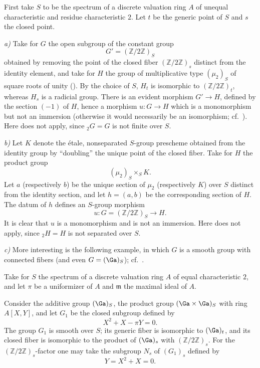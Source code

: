 First take \(S\) to be the spectrum of a discrete valuation ring
\(A\) of unequal characteristic and residue characteristic \(2\).
Let \(t\) be the generic point of \(S\) and \(s\) the closed point.

\medskip
\noindent\textit{a)} Take for \(G\) the open subgroup of the constant
group
\[
  G'=(\mathbb Z/2\mathbb Z)_S
\]
obtained by removing the point of the closed fiber
\((\mathbb Z/2\mathbb Z)_s\) distinct from the identity element, and
take for \(H\) the group of multiplicative type
\((\mu_2)_S\) of square roots of unity (). By the
choice of \(S\), \(H_t\) is isomorphic to
\((\mathbb Z/2\mathbb Z)_t\), whereas \(H_s\) is a radicial group.
There is an evident morphism \(G'\to H\), defined by the section
\((-1)\) of \(H\), hence a morphism \(u:G\to H\) which is a
monomorphism but not an immersion (otherwise it would necessarily be
an isomorphism; cf.\ ). Here  does not
apply, since \({}_{2}G=G\) is not finite over \(S\).

\medskip
\noindent\textit{b)} Let \(K\) denote the étale, nonseparated
\(S\)-group prescheme obtained from the identity group by
``doubling'' the unique point of the closed fiber. Take for \(H\) the
product group
\[
  (\mu_2)_S\times_S K.
\]
Let \(a\) (respectively \(b\)) be the unique section of \(\mu_2\)
(respectively \(K\)) over \(S\) distinct from the identity section,
and let \(h=(a,b)\) be the corresponding section of \(H\). The datum
of \(h\) defines an \(S\)-group morphism
\[
  u:G=(\mathbb Z/2\mathbb Z)_S\longrightarrow H.
\]
It is clear that \(u\) is a monomorphism and is not an immersion.
Here  does not apply, since \({}_{2}H=H\) is not
separated over \(S\).

\medskip
\noindent{}\textit{c)} More interesting is the following example, in
which \(G\) is a smooth group with connected fibers (and even
\(G=(\Ga)_S\)); cf.\ .

Take for \(S\) the spectrum of a discrete valuation ring \(A\) of
equal characteristic \(2\), and let \(\pi\) be a uniformizer of
\(A\) and \(\mathfrak m\) the maximal ideal of \(A\).

Consider the additive group \((\Ga)_S\), the product group
\((\Ga\times\Ga)_S\) with ring \(A[X,Y]\), and let \(G_1\) be the
closed subgroup defined by
\begin{equation}
  X^2+X-\pi Y=0.
  \tag{1}\label{sga3:xvi:eq:1}
\end{equation}
The group \(G_1\) is smooth over \(S\); its generic fiber is
isomorphic to \((\Ga)_t\), and its closed fiber is isomorphic to the
product of \((\Ga)_s\) with \((\mathbb Z/2\mathbb Z)_s\). For the
\((\mathbb Z/2\mathbb Z)_s\)-factor one may take the subgroup \(N_s\)
of \((G_1)_s\) defined by
\begin{equation}
  Y=X^2+X=0.
  \tag{2}\label{sga3:xvi:eq:2}
\end{equation}

